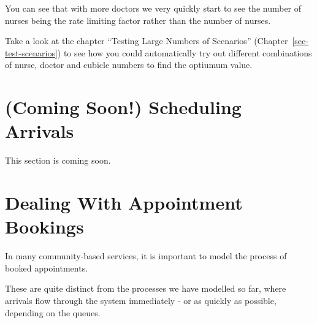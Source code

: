 \documentclass[
  letterpaper,
  DIV=11,
  numbers=noendperiod]{scrreprt}
\begin{document}
You can see that with more doctors we very quickly start to see the
number of nurses being the rate limiting factor rather than the number
of nurses.

\begin{tcolorbox}[enhanced jigsaw, colframe=quarto-callout-note-color-frame, bottomtitle=1mm, breakable, rightrule=.15mm, coltitle=black, colbacktitle=quarto-callout-note-color!10!white, opacityback=0, leftrule=.75mm, arc=.35mm, toptitle=1mm, title=\textcolor{quarto-callout-note-color}{\faInfo}\hspace{0.5em}{Note}, titlerule=0mm, colback=white, toprule=.15mm, bottomrule=.15mm, left=2mm, opacitybacktitle=0.6]

Take a look at the chapter ``Testing Large Numbers of Scenarios''
(Chapter~\ref{sec-test-scenarios}) to see how you could automatically
try out different combinations of nurse, doctor and cubicle numbers to
find the optiumum value.

\end{tcolorbox}

\chapter{(Coming Soon!) Scheduling
Arrivals}\label{coming-soon-scheduling-arrivals}

\begin{tcolorbox}[enhanced jigsaw, colframe=quarto-callout-note-color-frame, bottomtitle=1mm, breakable, rightrule=.15mm, coltitle=black, colbacktitle=quarto-callout-note-color!10!white, opacityback=0, leftrule=.75mm, arc=.35mm, toptitle=1mm, title=\textcolor{quarto-callout-note-color}{\faInfo}\hspace{0.5em}{Note}, titlerule=0mm, colback=white, toprule=.15mm, bottomrule=.15mm, left=2mm, opacitybacktitle=0.6]

This section is coming soon.

\end{tcolorbox}

\chapter{Dealing With Appointment
Bookings}\label{dealing-with-appointment-bookings}

In many community-based services, it is important to model the process
of booked appointments.

These are quite distinct from the processes we have modelled so far,
where arrivals flow through the system immediately - or as quickly as
possible, depending on the queues.
\end{document}
